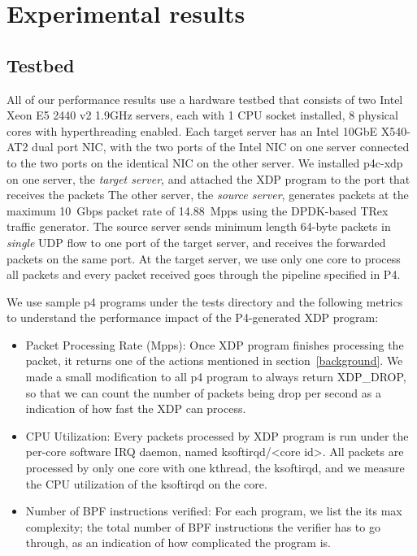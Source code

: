 \section{Experimental results}\label{sec:results}
\subsection{Testbed}
All of our performance results use a hardware testbed that consists of
two Intel Xeon E5 2440 v2 1.9GHz servers, each with 1 CPU socket installed,
8 physical cores with hyperthreading enabled. 
Each target server has an Intel 10GbE X540-AT2 dual
port NIC, with the two ports of the Intel NIC on one server connected
to the two ports on the identical NIC on the other server.
We installed p4c-xdp on one server, the {\em target server}, and
attached the XDP program to the port that receives the packets
The other server, the {\em source server}, generates packets
at the maximum 10~Gbps packet rate of 14.88~Mpps using the DPDK-based
TRex~\cite{trex} traffic generator.  The source server sends minimum
length 64-byte packets in {\em single} UDP flow to one port of the
target server, and receives the forwarded packets on the same port.
At the target server, we use only one core to process all packets and
every packet received goes through the pipeline specified in P4.

We use sample p4 programs under the tests directory and the following
metrics to understand the performance impact of the P4-generated XDP
program:
\begin{itemize}
\item Packet Processing Rate (Mpps): Once XDP program finishes processing
the packet, it returns one of the actions mentioned in section~\ref{background}.
We made a small modification to all p4 program to always return XDP\_DROP,
so that we can count the number of packets being drop per second as a
indication of how fast the XDP can process.
\item CPU Utilization: Every packets processed by XDP program is run
under the per-core software IRQ daemon, named ksoftirqd/<core id>.
All packets are processed by only one core with one kthread, the
ksoftirqd, and we measure the CPU utilization of the ksoftirqd on
the core.
\item Number of BPF instructions verified: For each program, we list
the its max complexity; the total number of BPF instructions the
verifier has to go through, as an indication of how complicated the
program is.
\end{itemize}

